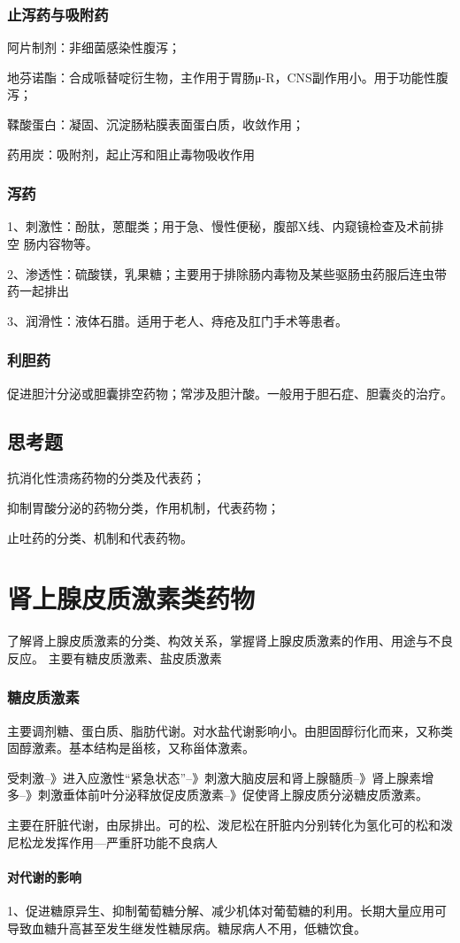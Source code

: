 \documentclass[UTF8]{ctexbook}
\begin{document}
\subsection{止泻药与吸附药}
阿片制剂：非细菌感染性腹泻；

地芬诺酯：合成哌替啶衍生物，主作用于胃肠μ-R，CNS副作用小。用于功能性腹泻；

鞣酸蛋白：凝固、沉淀肠粘膜表面蛋白质，收敛作用；

药用炭：吸附剂，起止泻和阻止毒物吸收作用
\subsection{泻药}
1、刺激性：酚肽，蒽醌类；用于急、慢性便秘，腹部X线、内窥镜检查及术前排空 肠内容物等。

2、渗透性：硫酸镁，乳果糖；主要用于排除肠内毒物及某些驱肠虫药服后连虫带药一起排出

3、润滑性：液体石腊。适用于老人、痔疮及肛门手术等患者。
\subsection{利胆药}促进胆汁分泌或胆囊排空药物；常涉及胆汁酸。一般用于胆石症、胆囊炎的治疗。
\section{思考题}
抗消化性溃疡药物的分类及代表药；

抑制胃酸分泌的药物分类，作用机制，代表药物；

止吐药的分类、机制和代表药物。
\chapter{肾上腺皮质激素类药物}
了解肾上腺皮质激素的分类、构效关系，掌握肾上腺皮质激素的作用、用途与不良反应。
主要有糖皮质激素、盐皮质激素
\subsection{糖皮质激素}
主要调剂糖、蛋白质、脂肪代谢。对水盐代谢影响小。由胆固醇衍化而来，又称类固醇激素。基本结构是甾核，又称甾体激素。

受刺激--》进入应激性“紧急状态”--》刺激大脑皮层和肾上腺髓质--》肾上腺素增多--》刺激垂体前叶分泌释放促皮质激素--》促使肾上腺皮质分泌糖皮质激素。

主要在肝脏代谢，由尿排出。可的松、泼尼松在肝脏内分别转化为氢化可的松和泼尼松龙发挥作用---严重肝功能不良病人
\subsubsection{对代谢的影响}
1、促进糖原异生、抑制葡萄糖分解、减少机体对葡萄糖的利用。长期大量应用可导致血糖升高甚至发生继发性糖尿病。糖尿病人不用，低糖饮食。
\end{document}
